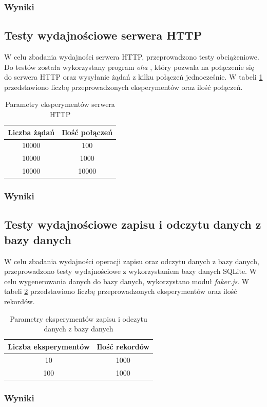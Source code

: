\subsubsection{Wyniki}

\subsection{Testy wydajnościowe serwera HTTP}
W celu zbadania wydajności serwera HTTP, przeprowadzono testy obciążeniowe. Do testów została wykorzystany program \textit{oha} \cite{oha}, który pozwala na połączenie się do serwera HTTP oraz wysyłanie żądań z kilku połączeń jednocześnie. W tabeli \ref{tab:http_experiments} przedstawiono liczbę przeprowadzonych eksperymentów oraz ilość połączeń.

\begin{table}[H]
  \centering
  \caption{Parametry eksperymentów serwera HTTP}
  \begin{tabular}{|c|c|}
    \hline
    \textbf{Liczba żądań} & \textbf{Ilość połączeń}\\ \hline
    10000 & 100 \\ \hline
    10000 & 1000 \\ \hline
    10000 & 10000 \\ \hline
  \end{tabular}
  \label{tab:http_experiments}
\end{table}

\subsubsection{Wyniki}

\subsection{Testy wydajnościowe zapisu i odczytu danych z bazy danych}
W celu zbadania wydajności operacji zapisu oraz odczytu danych z bazy danych, przeprowadzono testy wydajnościowe z wykorzystaniem bazy danych SQLite. W celu wygenerowania danych do bazy danych, wykorzystano moduł \textit{faker.js}. W tabeli \ref{tab:database_experiments} przedstawiono liczbę przeprowadzonych eksperymentów oraz ilość rekordów.

\begin{table}[H]
  \centering
  \caption{Parametry eksperymentów zapisu i odczytu danych z bazy danych}
  \begin{tabular}{|c|c|}
    \hline
    \textbf{Liczba eksperymentów} & \textbf{Ilość rekordów}\\ \hline
    10 & 1000 \\ \hline
    100 & 1000 \\ \hline
  \end{tabular}
  \label{tab:database_experiments}
\end{table}

\subsubsection{Wyniki}

